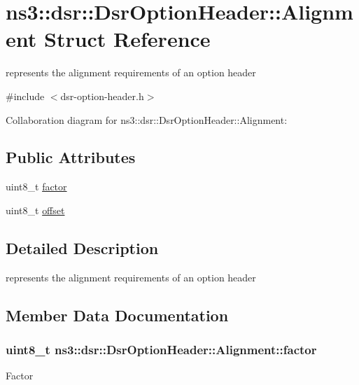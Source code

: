 \hypertarget{structns3_1_1dsr_1_1DsrOptionHeader_1_1Alignment}{}\section{ns3\+:\+:dsr\+:\+:Dsr\+Option\+Header\+:\+:Alignment Struct Reference}
\label{structns3_1_1dsr_1_1DsrOptionHeader_1_1Alignment}


represents the alignment requirements of an option header  




{\ttfamily \#include $<$dsr-\/option-\/header.\+h$>$}



Collaboration diagram for ns3\+:\+:dsr\+:\+:Dsr\+Option\+Header\+:\+:Alignment\+:
\subsection*{Public Attributes}
\begin{DoxyCompactItemize}
\item 
uint8\+\_\+t \hyperlink{structns3_1_1dsr_1_1DsrOptionHeader_1_1Alignment_a13de06899cf554b9cf09c5b39f6e2009}{factor}
\item 
uint8\+\_\+t \hyperlink{structns3_1_1dsr_1_1DsrOptionHeader_1_1Alignment_a5b561bf84fff4254d78fd2422e5435d1}{offset}
\end{DoxyCompactItemize}


\subsection{Detailed Description}
represents the alignment requirements of an option header 

\subsection{Member Data Documentation}
\subsubsection[{\texorpdfstring{factor}{factor}}]{\setlength{\rightskip}{0pt plus 5cm}uint8\+\_\+t ns3\+::dsr\+::\+Dsr\+Option\+Header\+::\+Alignment\+::factor}\hypertarget{structns3_1_1dsr_1_1DsrOptionHeader_1_1Alignment_a13de06899cf554b9cf09c5b39f6e2009}{}\label{structns3_1_1dsr_1_1DsrOptionHeader_1_1Alignment_a13de06899cf554b9cf09c5b39f6e2009}
Factor 
